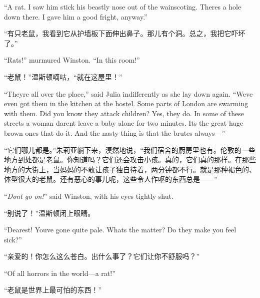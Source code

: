 \begin{paracol}{2}
``A rat. I saw him stick his beastly nose out of the wainscoting.
There\textquotesingle s a hole down there. I gave him a good fright,
anyway.''

\switchcolumn

``有只老鼠，我看到它从护墙板下面伸出鼻子。那儿有个洞。总之，我把它吓坏了。''

\switchcolumn*

``Rats!'' murmured Winston. ``In this room!''

\switchcolumn

``老鼠！''温斯顿嘀咕，``就在这屋里！''

\switchcolumn*

``They\textquotesingle re all over the place,'' said Julia indifferently
as she lay down again. ``We\textquotesingle ve even got them in the
kitchen at the hostel. Some parts of London are swarming with them. Did
you know they attack children? Yes, they do. In some of these streets a
woman daren\textquotesingle t leave a baby alone for two minutes.
It\textquotesingle s the great huge brown ones that do it. And the nasty
thing is that the brutes always---''

\switchcolumn

``它们哪儿都是。''朱莉亚躺下来，漠然地说，``我们宿舍的厨房里也有。伦敦的一些地方到处都是老鼠。你知道吗？它们还会攻击小孩。真的，它们真的那样。在那些地方的大街上，当妈妈的不敢让孩子独自待着，两分钟都不行。就是那种褐色的、体型很大的老鼠。还有恶心的事儿呢，这些令人作呕的东西总是——''

\switchcolumn*

``\emph{Don\textquotesingle t go on!}'' said Winston, with his eyes
tightly shut.

\switchcolumn

``别说了！''温斯顿闭上眼睛。

\switchcolumn*

``Dearest! You\textquotesingle ve gone quite pale. What\textquotesingle s
the matter? Do they make you feel sick?''

\switchcolumn

``亲爱的！你怎么这么苍白。出什么事了？它们让你不舒服吗？''

\switchcolumn*

``Of all horrors in the world---a rat!''

\switchcolumn

``老鼠是世界上最可怕的东西！''

\switchcolumn*


\end{paracol}
